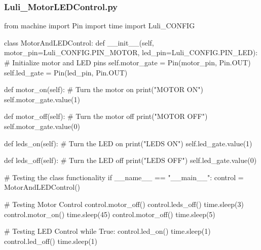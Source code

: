 \documentclass[12pt]{article} %
\begin{document}
\subsubsection{Luli\_MotorLEDControl.py}
\begin{pythoncode}[caption={Pico W Low Side Switching MOSFET Control Code}]
    from machine import Pin
    import time
    import Luli_CONFIG
    
    class MotorAndLEDControl:
        def __init__(self, motor_pin=Luli_CONFIG.PIN_MOTOR, led_pin=Luli_CONFIG.PIN_LED):
            # Initialize motor and LED pins
            self.motor_gate = Pin(motor_pin, Pin.OUT)
            self.led_gate = Pin(led_pin, Pin.OUT)
    
        def motor_on(self):
            # Turn the motor on
            print("MOTOR ON")
            self.motor_gate.value(1)
    
        def motor_off(self):
            # Turn the motor off
            print("MOTOR OFF")
            self.motor_gate.value(0)
    
        def leds_on(self):
            # Turn the LED on
            print("LEDS ON")
            self.led_gate.value(1)
    
        def leds_off(self):
            # Turn the LED off
            print("LEDS OFF")
            self.led_gate.value(0)
    
    # Testing the class functionality
    if __name__ == "__main__":
        control = MotorAndLEDControl()
    
        # Testing Motor Control
        control.motor_off()
        control.leds_off()
        time.sleep(3)
        control.motor_on()
        time.sleep(45)
        control.motor_off()
        time.sleep(5)
    
        # Testing LED Control
        while True:
            control.led_on()
            time.sleep(1)
            control.led_off()
            time.sleep(1)
    
    
\end{pythoncode}
\end{document}

